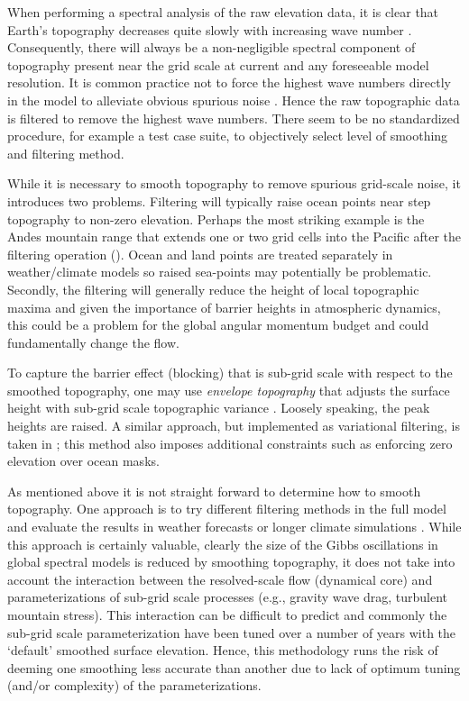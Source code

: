 \documentclass[gmd]{copernicus}
\begin{document}
When performing a spectral analysis of the raw elevation data, it is clear that Earth's topography decreases quite slowly with increasing wave number \citep[see, e.g., ][]{B1993GRL,U2001ECMWF,GLS2006NPG}. Consequently, there will always be a non-negligible spectral component of topography present near the grid scale at current and any foreseeable model resolution. It is common practice not to force the highest wave numbers directly in the model to alleviate obvious spurious noise \citep[e.g.][]{NSM1994JC,LH1997MWR}. Hence the raw topographic data is filtered to remove the highest wave numbers. There seem to be no standardized procedure, for example a test case suite, to objectively select level of smoothing and filtering method. 

While it is necessary to smooth topography to remove spurious grid-scale noise, it introduces two problems. Filtering will typically raise ocean points near step topography to non-zero elevation. Perhaps the most striking example is the Andes mountain range that extends one or two grid cells into the Pacific after the filtering operation ({\color{red}{Figure??}}). Ocean and land points are treated separately in weather/climate models so raised sea-points may potentially be problematic. Secondly, the filtering will generally reduce the height of local topographic maxima and given the importance of barrier heights in atmospheric dynamics, this could be a problem for the global angular momentum budget and could fundamentally change the flow. 

To capture the barrier effect (blocking) that is sub-grid scale with respect to the smoothed topography, one may use {\em{envelope topography}} that adjusts the surface height with sub-grid scale topographic variance \citep{WTS1983QJRMS}. Loosely speaking, the peak heights are raised. A similar approach, but implemented as variational filtering, is taken in \cite{RTS2006QJRMS}; this method also imposes additional constraints such as enforcing zero elevation over ocean masks.

As mentioned above it is not straight forward to determine how to smooth topography. One approach is to try different filtering methods in the full model and evaluate the results in weather forecasts or longer climate simulations \citep{NSM1994JC,B1995QJRMS,H1996JC}. While this approach is certainly valuable, clearly the size of the Gibbs oscillations in global spectral models is reduced by smoothing topography, it does not take into account the interaction between the resolved-scale flow (dynamical core) and parameterizations of sub-grid scale processes (e.g., gravity wave drag, turbulent mountain stress). This interaction can be difficult to predict and commonly the sub-grid scale parameterization have been tuned over a number of years with the `default' smoothed surface elevation. Hence, this methodology runs the risk of deeming one smoothing less accurate than another due to lack of optimum tuning (and/or complexity) of the parameterizations.
\end{document}
